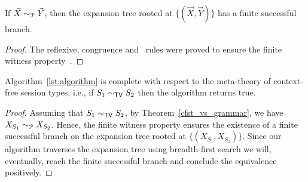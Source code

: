 \begin{proposition} 
\label{finite_witness}
	If $\vec X \sim_{\mathcal{P}} \vec Y$, then the expansion tree rooted at 
	$\{(\vec X, \vec Y)\}$ has a finite successful branch.
\end{proposition}

\begin{proof}
	The reflexive, congruence and \BPA\ rules were proved to ensure 
	the finite witness property~\cite{janvcar1999techniques}. 
\end{proof}

\begin{theorem}
	Algorithm~\ref{lst:algorithm} is complete with respect to the meta-theory 
	of context-free session types, i.e., if $S_1 \sim_{\mathsf{TV}} S_2$ then 
	the algorithm returns \textsf{true}.
\end{theorem}

\begin{proof}
	Assuming that $S_1 \sim_{\mathsf{TV}} S_2$, by Theorem~\ref{cfst_vs_grammar}, we 
	have $X_{S_1} \sim_{\mathcal{P}} X_{S_2}$. Hence, the finite witness property 
	ensures the existence of a finite successful branch on the expansion 
	tree rooted at $\{(X_{S_1},  X_{S_2})\}$. Since our algorithm traverses 
	the expansion tree using breadth-first search we will, eventually, 
	reach the finite successful branch and conclude the equivalence positively.
\end{proof}
